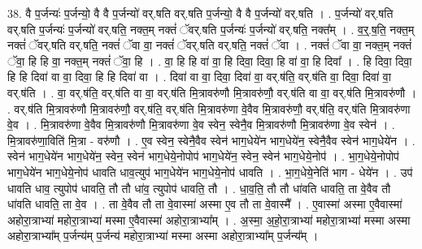 \documentclass[17pt]{extarticle}
\begin{document}
38. वै प॒र्जन्यः॑ प॒र्जन्यो॒ वै वै प॒र्जन्यो॑ वर्.षति वर्.षति प॒र्जन्यो॒ वै वै प॒र्जन्यो॑ वर्.षति । . प॒र्जन्यो॑ वर्.षति वर्.षति प॒र्जन्यः॑ प॒र्जन्यो॑ वर्.षति॒ नक्त॒म् नक्तं॑ ॅवर्.षति प॒र्जन्यः॑ प॒र्जन्यो॑ वर्.षति॒ नक्त᳚म् । . व॒र्॒.ष॒ति॒ नक्त॒म् नक्तं॑ ॅवर्.षति वर्.षति॒ नक्तं॑ ॅवा वा॒ नक्तं॑ ॅवर्.षति वर्.षति॒ नक्तं॑ ॅवा । . नक्तं॑ ॅवा वा॒ नक्त॒म् नक्तं॑ ॅवा॒ हि हि वा॒ नक्त॒म् नक्तं॑ ॅवा॒ हि । . वा॒ हि हि वा॑ वा॒ हि दिवा॒ दिवा॒ हि वा॑ वा॒ हि दिवा᳚ । . हि दिवा॒ दिवा॒ हि हि दिवा॑ वा वा॒ दिवा॒ हि हि दिवा॑ वा । . दिवा॑ वा वा॒ दिवा॒ दिवा॑ वा॒ वर्.ष॑ति॒ वर्.ष॑ति वा॒ दिवा॒ दिवा॑ वा॒ वर्.ष॑ति । . वा॒ वर्.ष॑ति॒ वर्.ष॑ति वा वा॒ वर्.ष॑ति मि॒त्रावरु॑णौ मि॒त्रावरु॑णौ॒ वर्.ष॑ति वा वा॒ वर्.ष॑ति मि॒त्रावरु॑णौ । . वर्.ष॑ति मि॒त्रावरु॑णौ मि॒त्रावरु॑णौ॒ वर्.ष॑ति॒ वर्.ष॑ति मि॒त्रावरु॑णा वे॒वैव मि॒त्रावरु॑णौ॒ वर्.ष॑ति॒ वर्.ष॑ति मि॒त्रावरु॑णा वे॒व । . मि॒त्रावरु॑णा वे॒वैव मि॒त्रावरु॑णौ मि॒त्रावरु॑णा वे॒व स्वेन॒ स्वेनै॒व मि॒त्रावरु॑णौ मि॒त्रावरु॑णा वे॒व स्वेन॑ । . मि॒त्रावरु॑णा॒विति॑ मि॒त्रा - वरु॑णौ । . ए॒व स्वेन॒ स्वेनै॒वैव स्वेन॑ भाग॒धेये॑न भाग॒धेये॑न॒ स्वेनै॒वैव स्वेन॑ भाग॒धेये॑न । . स्वेन॑ भाग॒धेये॑न भाग॒धेये॑न॒ स्वेन॒ स्वेन॑ भाग॒धेये॒नोपोप॑ भाग॒धेये॑न॒ स्वेन॒ स्वेन॑ भाग॒धेये॒नोप॑ । . भा॒ग॒धेये॒नोपोप॑ भाग॒धेये॑न भाग॒धेये॒नोप॑ धावति धाव॒त्युप॑ भाग॒धेये॑न भाग॒धेये॒नोप॑ धावति । . भा॒ग॒धेये॒नेति॑ भाग - धेये॑न । . उप॑ धावति धाव॒ त्युपोप॑ धावति॒ तौ तौ धा॑व॒ त्युपोप॑ धावति॒ तौ । . धा॒व॒ति॒ तौ तौ धा॑वति धावति॒ ता वे॒वैव तौ धा॑वति धावति॒ ता वे॒व । . ता वे॒वैव तौ ता वे॒वास्मा॑ अस्मा ए॒व तौ ता वे॒वास्मै᳚ । . ए॒वास्मा॑ अस्मा ए॒वैवास्मा॑ अहोरा॒त्राभ्या॑ महोरा॒त्राभ्या॑ मस्मा ए॒वैवास्मा॑ अहोरा॒त्राभ्या᳚म् । . अ॒स्मा॒ अ॒हो॒रा॒त्राभ्या॑ महोरा॒त्राभ्या॑ मस्मा अस्मा अहोरा॒त्राभ्या᳚म् प॒र्जन्य॑म् प॒र्जन्य॑ महोरा॒त्राभ्या॑ मस्मा अस्मा अहोरा॒त्राभ्या᳚म् प॒र्जन्य᳚म् । \newline
\pagebreak
{}
\end{document}
